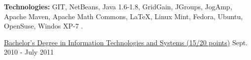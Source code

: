 \begin{cventries}
{\begin{cvitems}
        \item[] {\textbf{Technologies:} \textcolor{rainbowcolor-olive}{GIT}, \textcolor{rainbowcolor-olive}{NetBeans}, \textcolor{rainbowcolor-indigo}{Java 1.6-1.8}, \textcolor{rainbowcolor-indigo}{GridGain}, \textcolor{rainbowcolor-indigo}{JGroups}, \textcolor{rainbowcolor-indigo}{JogAmp}, \textcolor{rainbowcolor-indigo}{Apache Maven}, \textcolor{rainbowcolor-indigo}{Apache Math Commons}, %
\textcolor{rainbowcolor-indigo}{LaTeX}, %
\textcolor{rainbowcolor-orange}{Linux Mint}, \textcolor{rainbowcolor-orange}{Fedora}, \textcolor{rainbowcolor-orange}{Ubuntu}, \textcolor{rainbowcolor-orange}{OpenSuse}, \textcolor{rainbowcolor-orange}{Windos XP-7}
		.}
      \end{cvitems}
    }
  \cventry
    {\href{https://www.ubi.pt/en/course/64}{Bachelor's Degree in Information Technologies and Systems (15/20 points)}} %
    {} %
    {} %
    {Sept. 2010 - July 2011} %
    {
}
\end{cventries}
